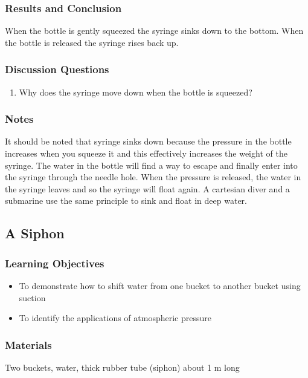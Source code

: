 \subsubsection*{Results and Conclusion}
When the bottle is gently squeezed the syringe sinks down to the bottom. When the bottle is released the syringe rises back up.  

\subsubsection*{Discussion Questions}
\begin{enumerate}
\item{Why does the syringe move down when the bottle is squeezed?}
\end{enumerate}

\subsubsection*{Notes}
It should be noted that syringe sinks down because the pressure in the bottle increases when you squeeze it and this effectively increases the weight of the syringe. The water in the bottle will find a way to escape and finally enter into the syringe through the needle hole. When the pressure is released, the water in the syringe leaves and so the syringe will float again.  A cartesian diver and a submarine use the same principle to sink and float in deep water.


\subsection{A Siphon}

\subsubsection*{Learning Objectives}
\begin{itemize}
\item{To demonstrate how to shift water from one bucket to another bucket using suction} 
\item{To identify the applications of atmospheric pressure} 
\end{itemize}

\subsubsection*{Materials}
Two buckets, water, thick rubber tube (siphon) about 1 m long

